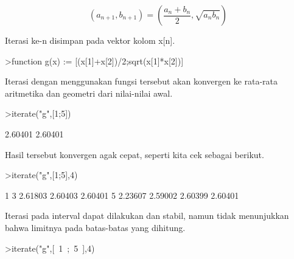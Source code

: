 \documentclass[a4paper,10pt]{article}
\begin{document}
\begin{eulernotebook}
\begin{eulercomment}
\begin{eulercomment}
\begin{eulercomment}
\begin{eulercomment}
\begin{eulercomment}
\begin{eulercomment}
\begin{eulercomment}
\begin{eulercomment}
\begin{eulercomment}
\begin{eulercomment}
\begin{eulercomment}
\begin{eulercomment}
\begin{eulercomment}
\begin{eulercomment}
\begin{eulercomment}
\begin{eulercomment}
\begin{eulercomment}
\begin{eulercomment}
\begin{eulercomment}
\begin{eulercomment}
\begin{eulercomment}
\begin{eulercomment}
\begin{eulercomment}
\begin{eulercomment}
\begin{eulercomment}
\begin{eulercomment}
\begin{eulercomment}
\begin{eulercomment}
\begin{eulercomment}
\begin{eulercomment}
\begin{eulercomment}
\begin{eulercomment}
\begin{eulercomment}
\end{eulercomment}
\begin{eulerformula}
\[
(a_{n+1},b_{n+1}) = \left( \frac{a_n+b_n}{2}, \sqrt{a_nb_n} \right)
\]
\end{eulerformula}
\begin{eulercomment}
Iterasi ke-n disimpan pada vektor kolom x[n].
\end{eulercomment}
\begin{eulerprompt}
>function g(x) := [(x[1]+x[2])/2;sqrt(x[1]*x[2])]
\end{eulerprompt}
\begin{eulercomment}
Iterasi dengan menggunakan fungsi tersebut akan konvergen ke rata-rata
aritmetika dan geometri dari nilai-nilai awal. 
\end{eulercomment}
\begin{eulerprompt}
>iterate("g",[1;5])
\end{eulerprompt}
\begin{euleroutput}
        2.60401 
        2.60401 
\end{euleroutput}
\begin{eulercomment}
Hasil tersebut konvergen agak cepat, seperti kita cek sebagai berikut.
\end{eulercomment}
\begin{eulerprompt}
>iterate("g",[1;5],4)
\end{eulerprompt}
\begin{euleroutput}
              1             3       2.61803       2.60403       2.60401 
              5       2.23607       2.59002       2.60399       2.60401 
\end{euleroutput}
\begin{eulercomment}
Iterasi pada interval dapat dilakukan dan stabil, namun tidak
menunjukkan bahwa limitnya pada batas-batas yang dihitung.
\end{eulercomment}
\begin{eulerprompt}
>iterate("g",[~1~;~5~],4)

\end{eulerprompt}
\end{eulercomment}
\end{eulercomment}
\end{eulercomment}
\end{eulercomment}
\end{eulercomment}
\end{eulercomment}
\end{eulercomment}
\end{eulercomment}
\end{eulercomment}
\end{eulercomment}
\end{eulercomment}
\end{eulercomment}
\end{eulercomment}
\end{eulercomment}
\end{eulercomment}
\end{eulercomment}
\end{eulercomment}
\end{eulercomment}
\end{eulercomment}
\end{eulercomment}
\end{eulercomment}
\end{eulercomment}
\end{eulercomment}
\end{eulercomment}
\end{eulercomment}
\end{eulercomment}
\end{eulercomment}
\end{eulercomment}
\end{eulercomment}
\end{eulercomment}
\end{eulercomment}
\end{eulercomment}
\end{eulernotebook}
\end{document}
